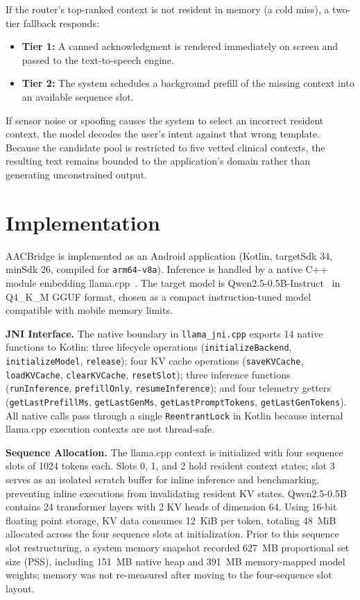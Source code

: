 \documentclass[conference]{IEEEtran}
\begin{document}
If the router's top-ranked context is not resident in memory (a cold miss), a two-tier fallback responds:
\begin{itemize}
\item \textbf{Tier 1:} A canned acknowledgment is rendered immediately on screen and passed to the text-to-speech engine.
\item \textbf{Tier 2:} The system schedules a background prefill of the missing context into an available sequence slot.
\end{itemize}
If sensor noise or spoofing causes the system to select an incorrect resident context, the model decodes the user's intent against that wrong template. Because the candidate pool is restricted to five vetted clinical contexts, the resulting text remains bounded to the application's domain rather than generating unconstrained output.

\section{Implementation}
\label{sec:implementation}

AACBridge is implemented as an Android application (Kotlin, targetSdk 34, minSdk 26, compiled for \texttt{arm64-v8a}). Inference is handled by a native C++ module embedding llama.cpp~\cite{llamacpp}. The target model is Qwen2.5-0.5B-Instruct~\cite{qwen25} in Q4\_K\_M GGUF format, chosen as a compact instruction-tuned model compatible with mobile memory limits.

\textbf{JNI Interface.}
The native boundary in \texttt{llama\_jni.cpp} exports 14 native functions to Kotlin: three lifecycle operations (\texttt{initializeBackend}, \texttt{initializeModel}, \texttt{release}); four KV cache operations (\texttt{saveKVCache}, \texttt{loadKVCache}, \texttt{clearKVCache}, \texttt{resetSlot}); three inference functions (\texttt{runInference}, \texttt{prefillOnly}, \texttt{resumeInference}); and four telemetry getters (\texttt{getLastPrefillMs}, \texttt{getLastGenMs}, \texttt{getLastPromptTokens}, \texttt{getLastGenTokens}). All native calls pass through a single \texttt{ReentrantLock} in Kotlin because internal llama.cpp execution contexts are not thread-safe.

\textbf{Sequence Allocation.}
The llama.cpp context is initialized with four sequence slots of 1024 tokens each. Slots 0, 1, and 2 hold resident context states; slot 3 serves as an isolated scratch buffer for inline inference and benchmarking, preventing inline executions from invalidating resident KV states. Qwen2.5-0.5B contains 24 transformer layers with 2 KV heads of dimension 64. Using 16-bit floating point storage, KV data consumes 12~KiB per token, totaling 48~MiB allocated across the four sequence slots at initialization. Prior to this sequence slot restructuring, a system memory snapshot recorded 627~MB proportional set size (PSS), including 151~MB native heap and 391~MB memory-mapped model weights; memory was not re-measured after moving to the four-sequence slot layout.
\end{document}
